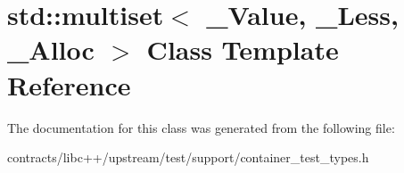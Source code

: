 \hypertarget{classstd_1_1multiset}{}\section{std\+:\+:multiset$<$ \+\_\+\+Value, \+\_\+\+Less, \+\_\+\+Alloc $>$ Class Template Reference}
\label{classstd_1_1multiset}


The documentation for this class was generated from the following file\+:\begin{DoxyCompactItemize}
\item 
contracts/libc++/upstream/test/support/container\+\_\+test\+\_\+types.\+h\end{DoxyCompactItemize}
